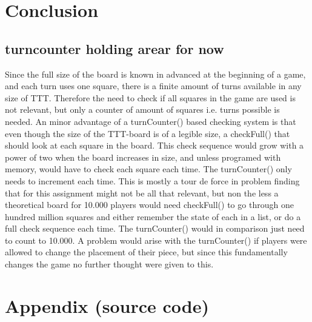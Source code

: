 \documentclass[a4paper,10pt]{article}
\begin{document}
	
	\section{Conclusion} 
	\subsection{turncounter holding arear for now}
	Since the full size of the board is known in advanced at the beginning of a game, and each turn uses one square,  there is a finite amount of turns available in any size of TTT. Therefore the need to check if all squares in the game are used is not relevant, but only a counter of amount of squares i.e. turns possible is needed. 
	An minor advantage of a turnCounter() based checking system is that even though the size of the TTT-board is of a legible size, a checkFull() that should look at each square in the board. This check sequence would grow with a power of two when the board increases in size, and unless programed with memory, would have to check each square each time. The turnCounter() only needs to increment each time. 
	This is mostly a tour de force in problem finding that for this assignment might not be all that relevant, but non the less a theoretical board for 10.000 players would need checkFull() to go through one hundred million squares and either remember the state of each in a list, or do a full check sequence each time. The turnCounter() would in comparison just need to count to 10.000.
	A problem would arise with the turnCounter() if players were allowed to change the placement of their piece, but since this fundamentally changes the game no further thought were given to this.
	
	
	\newpage
	
	\section{Appendix (source code)}
	
	
	\begin{comment}
	Hvis Fern Time er lavet tilføjes det her og begin og end comment skal fjernes. 
	\textbf{Fern program}
	
	
	\end{comment}
	
\end{document}
